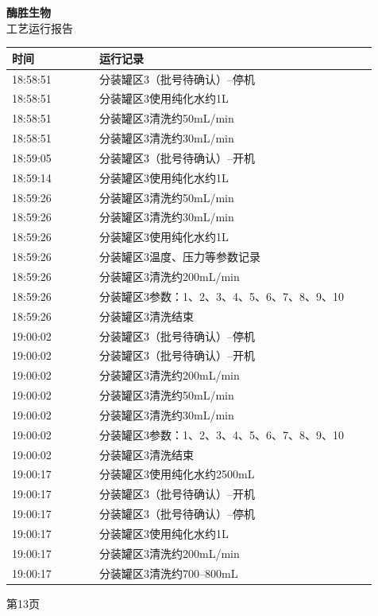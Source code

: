 \documentclass[UTF8,10pt,a4paper,fontset=fandol]{ctexart}
\begin{document}
\newpage

\noindent
\begin{minipage}[t]{0.48\linewidth}
\centering
\textbf{酶胜生物}\\[2pt]
工艺运行报告

\smallskip
\begin{tabular}{|p{0.22\linewidth}|p{0.70\linewidth}|}
\hline
时间 & 运行记录\\ \hline
18:58:51 & 分装罐区3（批号待确认）--停机\\ \hline
18:58:51 & 分装罐区3使用纯化水约1L\\ \hline
18:58:51 & 分装罐区3清洗约50mL/min\\ \hline
18:58:51 & 分装罐区3清洗约30mL/min\\ \hline
18:59:05 & 分装罐区3（批号待确认）--开机\\ \hline
18:59:14 & 分装罐区3使用纯化水约1L\\ \hline
18:59:26 & 分装罐区3清洗约50mL/min\\ \hline
18:59:26 & 分装罐区3清洗约30mL/min\\ \hline
18:59:26 & 分装罐区3使用纯化水约1L\\ \hline
18:59:26 & 分装罐区3温度、压力等参数记录\\ \hline
18:59:26 & 分装罐区3清洗约200mL/min\\ \hline
18:59:26 & 分装罐区3参数：1、2、3、4、5、6、7、8、9、10\\ \hline
18:59:26 & 分装罐区3清洗结束\\ \hline
19:00:02 & 分装罐区3（批号待确认）--停机\\ \hline
19:00:02 & 分装罐区3（批号待确认）--开机\\ \hline
19:00:02 & 分装罐区3清洗约200mL/min\\ \hline
19:00:02 & 分装罐区3清洗约50mL/min\\ \hline
19:00:02 & 分装罐区3清洗约30mL/min\\ \hline
19:00:02 & 分装罐区3参数：1、2、3、4、5、6、7、8、9、10\\ \hline
19:00:02 & 分装罐区3清洗结束\\ \hline
19:00:17 & 分装罐区3使用纯化水约2500mL\\ \hline
19:00:17 & 分装罐区3（批号待确认）--开机\\ \hline
19:00:17 & 分装罐区3（批号待确认）--停机\\ \hline
19:00:17 & 分装罐区3使用纯化水约1L\\ \hline
19:00:17 & 分装罐区3清洗约200mL/min\\ \hline
19:00:17 & 分装罐区3清洗约700--800mL\\ \hline
\end{tabular}

\vspace{2pt}
第13页
\end{minipage}
\end{document}
